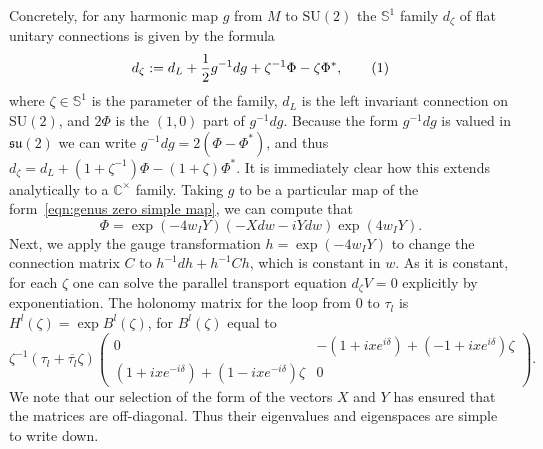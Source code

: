 \documentclass{article}
\numberwithin{equation}{section}
\numberwithin{figure}{section}
\newcommand{\labelthis}[1]{\addtocounter{equation}{1}\tag{\theequation}\label{#1}}
\renewcommand*{\bar}{\overline}
\newcommand{\iu}{i}
\newcommand{\C}{\mathbb{C}}
\renewcommand{\S}{\mathbb{S}}
\newcommand{\SU}{\mathrm{SU}}
\newcommand{\su}{\mathfrak{su}}
\begin{document}
Concretely, for any harmonic map $g$ from $M$ to $\SU(2)$ the $\S^1$ family $d_\zeta$ of flat unitary connections is given by the formula
\[
d_\zeta := d_L + \frac{1}{2}g^{-1}dg + \zeta^{-1}\Phi - \zeta\Phi^*,
\labelthis{eqn:flat connection translation}
\]
where $\zeta\in\S^1$ is the parameter of the family, $d_L$ is the left invariant connection on $\SU(2)$, and $2\Phi$ is the $(1,0)$ part of $g^{-1}dg$. Because the form $g^{-1}dg$ is valued in $\su(2)$ we can write $g^{-1}dg = 2(\Phi - \Phi^*)$, and thus $d_\zeta = d_L + (1+\zeta^{-1})\Phi - (1+\zeta)\Phi^*$.
It is immediately clear how this extends analytically to a $\C^\times$ family. Taking $g$ to be a particular map of the form~\eqref{eqn:genus zero simple map}, we can compute that
\[
\Phi = \exp(-4w_I Y)(-Xdw -iYdw)\exp(4w_I Y).
\]
Next, we apply the gauge transformation $h = \exp(-4 w_I Y)$ to change the connection matrix $C$ to $h^{-1}dh + h^{-1}Ch$, which is constant in $w$.
As it is constant, for each $\zeta$ one can solve the parallel transport equation $d_\zeta V = 0$ explicitly by exponentiation.
The holonomy matrix for the loop from $0$ to $\tau_l$ is $H^l(\zeta) = \exp B^l(\zeta)$, for $B^l(\zeta)$ equal to 
\[
\zeta^{-1}(\tau_l + \bar{\tau_l}\zeta) 
\begin{pmatrix}
0 & - (1 + \iu xe^{\iu \delta}) + (-1 + \iu x e^{\iu \delta})\zeta \\
(1+\iu xe^{-\iu \delta}) + (1-\iu xe^{-\iu \delta})\zeta & 0
\end{pmatrix}.
\]
We note that our selection of the form of the vectors $X$ and $Y$ has ensured that the matrices are off-diagonal. Thus their eigenvalues and eigenspaces are simple to write down.
\end{document}
